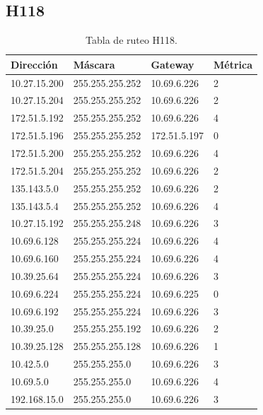 \documentclass[12pt,titlepage]{article}
\begin{document}
\subsection{H118}
\begin{table}
  \begin{center}
    \begin{tabular}{|l|l|l|l|}
      \hline
        \bf{Direcci\'on} & \bf{M\'ascara} & \bf{Gateway} & \bf{M\'etrica} \\
      \hline 
	10.27.15.200  & 255.255.255.252 & 10.69.6.226 & 2 \\
        10.27.15.204  & 255.255.255.252 & 10.69.6.226 & 2 \\
        172.51.5.192  & 255.255.255.252 & 10.69.6.226 & 4 \\
        172.51.5.196  & 255.255.255.252 & 172.51.5.197 & 0 \\
        172.51.5.200  & 255.255.255.252 & 10.69.6.226 & 4 \\
        172.51.5.204  & 255.255.255.252 & 10.69.6.226 & 2 \\
        135.143.5.0   & 255.255.255.252 & 10.69.6.226 & 2 \\
        135.143.5.4   & 255.255.255.252 & 10.69.6.226 & 4 \\ 	
	10.27.15.192  & 255.255.255.248 & 10.69.6.226 & 3 \\
	10.69.6.128   & 255.255.255.224 & 10.69.6.226 & 4 \\
        10.69.6.160   & 255.255.255.224 & 10.69.6.226 & 4 \\
	10.39.25.64   & 255.255.255.224 & 10.69.6.226 & 3 \\       
	10.69.6.224   & 255.255.255.224 & 10.69.6.225 & 0 \\
	10.69.6.192   & 255.255.255.224 & 10.69.6.226 & 3 \\	
	10.39.25.0    & 255.255.255.192 & 10.69.6.226 & 2 \\
	10.39.25.128  & 255.255.255.128 & 10.69.6.226 & 1 \\
	10.42.5.0     & 255.255.255.0 & 10.69.6.226 & 3 \\
        10.69.5.0     & 255.255.255.0 & 10.69.6.226 & 4 \\
        192.168.15.0  & 255.255.255.0 & 10.69.6.226 & 3 \\  
    \hline
    \end{tabular} \\
  \end{center}
  \caption{Tabla de ruteo H118.}
\end{table}
\newpage
\end{document}
